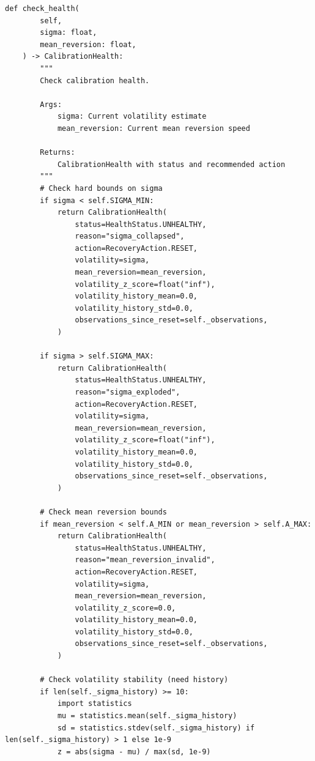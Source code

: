 \begin{lstlisting}[language=jsonx,caption={Calibration health check implementation}]
    def check_health(
        self,
        sigma: float,
        mean_reversion: float,
    ) -> CalibrationHealth:
        """
        Check calibration health.
        
        Args:
            sigma: Current volatility estimate
            mean_reversion: Current mean reversion speed
            
        Returns:
            CalibrationHealth with status and recommended action
        """
        # Check hard bounds on sigma
        if sigma < self.SIGMA_MIN:
            return CalibrationHealth(
                status=HealthStatus.UNHEALTHY,
                reason="sigma_collapsed",
                action=RecoveryAction.RESET,
                volatility=sigma,
                mean_reversion=mean_reversion,
                volatility_z_score=float("inf"),
                volatility_history_mean=0.0,
                volatility_history_std=0.0,
                observations_since_reset=self._observations,
            )
        
        if sigma > self.SIGMA_MAX:
            return CalibrationHealth(
                status=HealthStatus.UNHEALTHY,
                reason="sigma_exploded",
                action=RecoveryAction.RESET,
                volatility=sigma,
                mean_reversion=mean_reversion,
                volatility_z_score=float("inf"),
                volatility_history_mean=0.0,
                volatility_history_std=0.0,
                observations_since_reset=self._observations,
            )
        
        # Check mean reversion bounds
        if mean_reversion < self.A_MIN or mean_reversion > self.A_MAX:
            return CalibrationHealth(
                status=HealthStatus.UNHEALTHY,
                reason="mean_reversion_invalid",
                action=RecoveryAction.RESET,
                volatility=sigma,
                mean_reversion=mean_reversion,
                volatility_z_score=0.0,
                volatility_history_mean=0.0,
                volatility_history_std=0.0,
                observations_since_reset=self._observations,
            )
        
        # Check volatility stability (need history)
        if len(self._sigma_history) >= 10:
            import statistics
            mu = statistics.mean(self._sigma_history)
            sd = statistics.stdev(self._sigma_history) if len(self._sigma_history) > 1 else 1e-9
            z = abs(sigma - mu) / max(sd, 1e-9)
            

\end{lstlisting}
